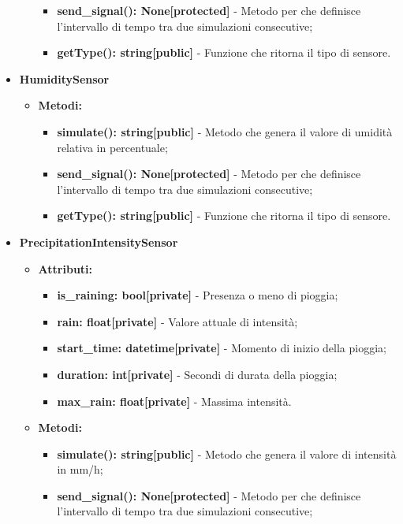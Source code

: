 \documentclass[8pt]{article}
\begin{document}
\begin{itemize}
\begin{itemize}
\begin{itemize}
            \item \textbf{send\_signal(): None[protected]} - Metodo per che definisce l'intervallo di tempo tra due simulazioni consecutive;
            \item \textbf{getType(): string[public]} - Funzione che ritorna il tipo di sensore.
        \end{itemize}
    \end{itemize}
    \item \textbf{HumiditySensor}
    \begin{itemize}
        \item \textbf{Metodi:}
        \begin{itemize}
            \item \textbf{simulate(): string[public]} - Metodo che genera il valore di umidità relativa in percentuale;
            \item \textbf{send\_signal(): None[protected]} - Metodo per che definisce l'intervallo di tempo tra due simulazioni consecutive;
            \item \textbf{getType(): string[public]} - Funzione che ritorna il tipo di sensore.
        \end{itemize}
    \end{itemize}
    \item \textbf{PrecipitationIntensitySensor}
    \begin{itemize}
        \item \textbf{Attributi:}
        \begin{itemize}
            \item \textbf{is\_raining: bool[private]} - Presenza o meno di pioggia;
            \item \textbf{rain: float[private]} - Valore attuale di intensità;
            \item \textbf{start\_time: datetime[private]} - Momento di inizio della pioggia;
            \item \textbf{duration: int[private]} - Secondi di durata della pioggia;
            \item \textbf{max\_rain: float[private]} - Massima intensità.
        \end{itemize}
        \item \textbf{Metodi:}
        \begin{itemize}
            \item \textbf{simulate(): string[public]} - Metodo che genera il valore di intensità in mm/h;
            \item \textbf{send\_signal(): None[protected]} - Metodo per che definisce l'intervallo di tempo tra due simulazioni consecutive;

\end{itemize}
\end{itemize}
\end{itemize}
\end{document}
